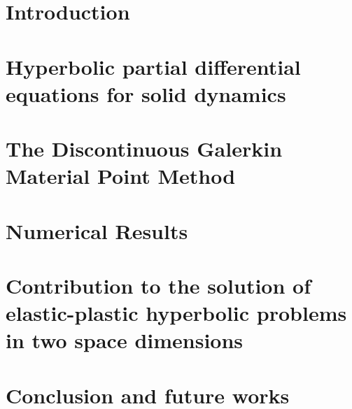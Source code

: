\documentclass[10pt,a4paper,twoside]{report}
\begin{document}
\tableofcontents{}


\chapter{Introduction}



\chapter{Hyperbolic partial differential equations for solid dynamics}
\label{chap:chap2}


\chapter{The Discontinuous Galerkin Material Point Method}
\label{chap:chap3}


\chapter{Numerical Results}
\label{chap:chap4}


\chapter{Contribution to the solution of elastic-plastic hyperbolic problems in two space dimensions}
\label{chap:chap5}



\chapter{Conclusion and future works}









\end{document}
